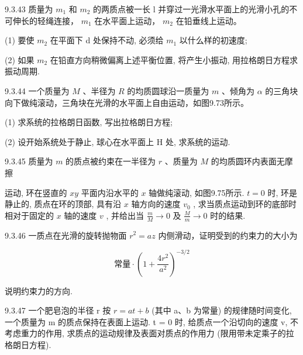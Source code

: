 \begin{problem}{9.3.43}
质量为 $m_{1}$ 和 $m_{2}$ 的两质点被一长 l 并穿过一光滑水平面上的光滑小孔的不可伸长的轻绳连接， $m_{1}$ 在水平面上运动， $m_{2}$ 在铅垂线上运动。

(1) 要使 $m_{2}$ 在平面下 d 处保持不动, 必须给 $m_{1}$ 以什么样的初速度;

(2) 如果 $m_{2}$ 在铅直方向稍微偏离上述平衡位置, 将产生小振动, 用拉格朗日方程求振动周期.
\end{problem}
\clearpage


\begin{problem}{9.3.44}
一个质量为 $M$ 、半径为 $R$ 的均质圆球沿一质量为 $m$ 、倾角为 $\alpha$ 的三角块向下做纯滚动，三角块在光滑的水平面上自由运动，如图9.73所示。

(1) 求系统的拉格朗日函数, 写出拉格朗日方程;

(2) 设开始系统处于静止, 球心在水平面上 H 处, 求系统的运动.
\begin{center}

\end{center}
\end{problem}
\clearpage


\begin{problem}{9.3.45}
质量为 $m$ 的质点被约束在一半径为 $r$ 、质量为 $M$ 的均质圆环内表面无摩擦

运动, 环在竖直的 $xy$ 平面内沿水平的 $x$ 轴做纯滚动, 如图9.75所示. $t = 0$ 时, 环是静止的, 质点在环的顶部, 具有沿 $x$ 轴方向的速度 $v_0$ , 求当质点运动到环的底部时相对于固定的 $x$ 轴的速度 $v$ , 并给出当 $\frac{m}{M} \to 0$ 及 $\frac{M}{m} \to 0$ 时的结果.
\begin{center}

\end{center}
\end{problem}
\clearpage


\begin{problem}{9.3.46}
一质点在光滑的旋转抛物面 $r^2 = az$ 内侧滑动，证明受到的约束力的大小为

\[
\text {常量} \cdot \left(1 + \frac {4 r ^ {2}}{a ^ {2}}\right) ^ {- 3 / 2}
\]

说明约束力的方向.
\end{problem}
\clearpage


\begin{problem}{9.3.47}
一个肥皂泡的半径 r 按 $r = at + b$ (其中 a、b 为常量) 的规律随时间变化, 一个质量为 m 的质点保持在表面上运动. t = 0 时, 给质点一个沿切向的速度 v, 不考虑重力的作用, 求质点的运动规律及表面对质点的作用力 (限用带未定乘子的拉格朗日方程).
\end{problem}
\clearpage


